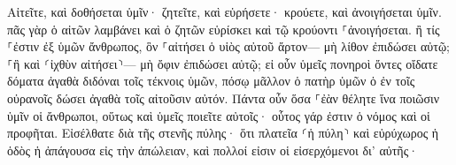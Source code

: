 \documentclass{openreader}
\begin{document}
Αἰτεῖτε, καὶ δοθήσεται ὑμῖν· ζητεῖτε, καὶ εὑρήσετε· κρούετε, καὶ ἀνοιγήσεται ὑμῖν. 
πᾶς γὰρ ὁ αἰτῶν λαμβάνει καὶ ὁ ζητῶν εὑρίσκει καὶ τῷ κρούοντι ⸀ἀνοιγήσεται. 
ἢ τίς ⸀ἐστιν ἐξ ὑμῶν ἄνθρωπος, ὃν ⸀αἰτήσει ὁ υἱὸς αὐτοῦ ἄρτον— μὴ λίθον ἐπιδώσει αὐτῷ; 
⸀ἢ καὶ ⸂ἰχθὺν αἰτήσει⸃— μὴ ὄφιν ἐπιδώσει αὐτῷ; 
εἰ οὖν ὑμεῖς πονηροὶ ὄντες οἴδατε δόματα ἀγαθὰ διδόναι τοῖς τέκνοις ὑμῶν, πόσῳ μᾶλλον ὁ πατὴρ ὑμῶν ὁ ἐν τοῖς οὐρανοῖς δώσει ἀγαθὰ τοῖς αἰτοῦσιν αὐτόν. 
Πάντα οὖν ὅσα ⸀ἐὰν θέλητε ἵνα ποιῶσιν ὑμῖν οἱ ἄνθρωποι, οὕτως καὶ ὑμεῖς ποιεῖτε αὐτοῖς· οὗτος γάρ ἐστιν ὁ νόμος καὶ οἱ προφῆται. 
Εἰσέλθατε διὰ τῆς στενῆς πύλης· ὅτι πλατεῖα ⸂ἡ πύλη⸃ καὶ εὐρύχωρος ἡ ὁδὸς ἡ ἀπάγουσα εἰς τὴν ἀπώλειαν, καὶ πολλοί εἰσιν οἱ εἰσερχόμενοι δι’ αὐτῆς· 
\end{document}
